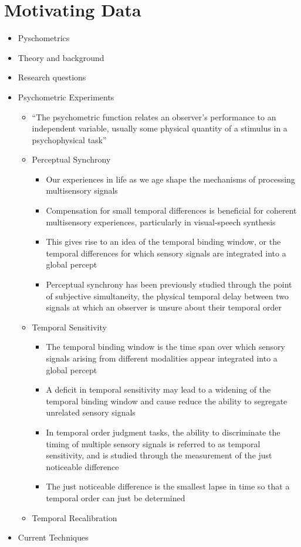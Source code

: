 \documentclass[
]{article}
\providecommand{\tightlist}{%
  \setlength{\itemsep}{0pt}\setlength{\parskip}{0pt}}
\begin{document}
\hypertarget{ch2}{%
\section{Motivating Data}\label{ch2}}

\begin{itemize}
\item
  Pyschometrics
\item
  Theory and background
\item
  Research questions
\item
  Psychometric Experiments

  \begin{itemize}
  \tightlist
  \item
    ``The psychometric function relates an observer's performance to an independent variable, usually some physical quantity of a stimulus in a psychophysical task'' \citep{wichmann2001a}
  \item
    Perceptual Synchrony

    \begin{itemize}
    \tightlist
    \item
      Our experiences in life as we age shape the mechanisms of processing multisensory signals
    \item
      Compensation for small temporal differences is beneficial for coherent multisensory experiences, particularly in visual-speech synthesis
    \item
      This gives rise to an idea of the temporal binding window, or the temporal differences for which sensory signals are integrated into a global percept
    \item
      Perceptual synchrony has been previously studied through the point of subjective simultaneity, the physical temporal delay between two signals at which an observer is unsure about their temporal order \citep{stone2001now}
    \end{itemize}
  \item
    Temporal Sensitivity

    \begin{itemize}
    \tightlist
    \item
      The temporal binding window is the time span over which sensory signals arising from different modalities appear integrated into a global percept
    \item
      A deficit in temporal sensitivity may lead to a widening of the temporal binding window and cause reduce the ability to segregate unrelated sensory signals
    \item
      In temporal order judgment tasks, the ability to discriminate the timing of multiple sensory signals is referred to as temporal sensitivity, and is studied through the measurement of the just noticeable difference
    \item
      The just noticeable difference is the smallest lapse in time so that a temporal order can just be determined
    \end{itemize}
  \item
    Temporal Recalibration
  \end{itemize}
\item
  Current Techniques


\end{itemize}
\end{document}
